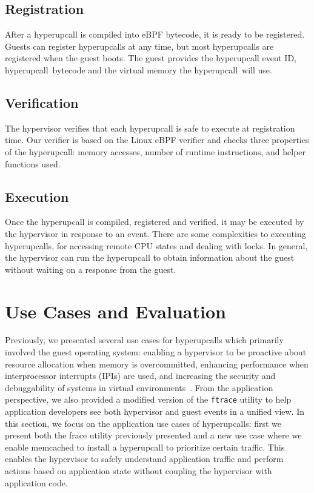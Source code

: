 \documentclass[11pt]{article}
\newcommand{\hypercallback}{hyperupcall\xspace{}}
\begin{document}
\subsection{Registration}
\label{sec:registration}

After a \hypercallback{} is compiled into eBPF bytecode, it is ready to
be registered. Guests can register \hypercallback{}s at any time, but
most \hypercallback{}s are registered when the guest boots. The guest
provides the \hypercallback{} event ID, \hypercallback~bytecode and 
the virtual memory the \hypercallback~will use. 

\subsection{Verification}
\label{sec:verification}

The hypervisor verifies that each \hypercallback{} is safe to
execute at registration time. Our verifier is based on the Linux 
eBPF verifier and checks three properties of the \hypercallback: 
memory accesses, number of runtime instructions, and helper functions
used. 


\subsection{Execution}
\label{sec:execution}

Once the hyperupcall is compiled, registered and verified, it may be executed by the hypervisor in response to an event.
There are some complexities to executing hyperupcalls, for accessing remote CPU states and dealing with locks. In general, the hypervisor can run the hyperupcall to obtain information about
the guest without waiting on a response from the guest.


\section{Use Cases and Evaluation}
\label{sec:evaluation}
Previously, we presented several use cases for hyperupcalls which primarily involved the guest operating system: enabling a hypervisor to be proactive about resource
allocation when memory is overcommitted, enhancing performance when interprocessor interrupts (IPIs)
are used, and increasing the security and debuggability of systems in virtual environments~\cite{amit2018design}. From the 
application perspective, we also provided a modified version of the \texttt{ftrace} utility to help application developers
see both hypervisor and guest events in a unified view. In this section, we focus on the application use cases
of hyperupcalls: first we present both the frace utility previously presented and a new use case where
we enable memcached to install a hyperupcall to prioritize certain traffic. This enables the hypervisor
to safely understand application traffic and perform actions based on application state without coupling
the hypervisor with application code.
\end{document}
